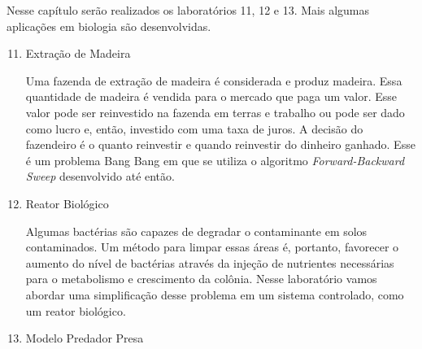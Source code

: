 Nesse capítulo serão realizados os laboratórios 11, 12 e 13. Mais algumas
aplicações em biologia são desenvolvidas.

\begin{enumerate}[label=\textbf{Lab \arabic*:}]
    \setcounter{enumi}{10}

    \item Extração de Madeira
    
    Uma fazenda de extração de madeira é considerada e produz madeira. Essa
    quantidade de madeira é vendida para o mercado que paga um valor. Esse
    valor pode ser reinvestido na fazenda em terras e trabalho ou pode ser
    dado como lucro e, então, investido com uma taxa de juros. A decisão do
    fazendeiro é o quanto reinvestir e quando reinvestir do dinheiro ganhado.
    Esse é um problema Bang Bang em que se utiliza o algoritmo
    \textit{Forward-Backward Sweep} desenvolvido até então. 

    \item Reator Biológico 
    
    Algumas bactérias são capazes de degradar o contaminante em solos
    contaminados. Um método para limpar essas áreas é, portanto, favorecer o
    aumento do nível de bactérias através da injeção de nutrientes
    necessárias para o metabolismo e crescimento da colônia. Nesse laboratório
    vamos abordar uma simplificação desse problema em um sistema controlado,
    como um reator biológico. 

    \item Modelo Predador Presa 

\end{enumerate}